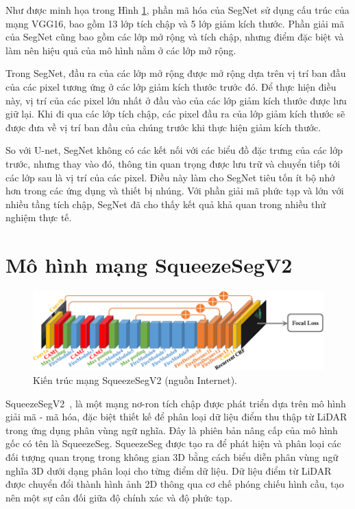 Như được minh họa trong Hình \ref{fig_SegNet}, phần mã hóa của SegNet sử dụng cấu trúc của mạng VGG16, bao gồm 13 lớp tích chập và 5 lớp giảm kích thước. Phần giải mã của SegNet cũng bao gồm các lớp mở rộng và tích chập, nhưng điểm đặc biệt và làm nên hiệu quả của mô hình nằm ở các lớp mở rộng.

Trong SegNet, đầu ra của các lớp mở rộng được mở rộng dựa trên vị trí ban đầu của các pixel tương ứng ở các lớp giảm kích thước trước đó. Để thực hiện điều này, vị trí của các pixel lớn nhất ở đầu vào của các lớp giảm kích thước được lưu giữ lại. Khi đi qua các lớp tích chập, các pixel đầu ra của lớp giảm kích thước sẽ được đưa về vị trí ban đầu của chúng trước khi thực hiện giảm kích thước.

So với U-net, SegNet không có các kết nối với các biểu đồ đặc trưng của các lớp trước, nhưng thay vào đó, thông tin quan trọng được lưu trữ và chuyển tiếp tới các lớp sau là vị trí của các pixel. Điều này làm cho SegNet tiêu tốn ít bộ nhớ hơn trong các ứng dụng và thiết bị nhúng. Với phần giải mã phức tạp và lớn với nhiều tầng tích chập, SegNet đã cho thấy kết quả khả quan trong nhiều thử nghiệm thực tế.

\section{Mô hình mạng SqueezeSegV2}

\begin{figure}[h]
	\centering
	\includegraphics[width=120mm]{fig/SegNetV2-architecture.png}
        \captionsetup{justification=centering}
	\caption{Kiến trúc mạng SqueezeSegV2 (nguồn Internet).}
	\label{fig_SegNet}
\end{figure}

SqueezeSegV2~\cite{wu2019squeezesegv2}, là một mạng nơ-ron tích chập được phát triển dựa trên mô hình giải mã - mã hóa, đặc biệt thiết kế để phân loại dữ liệu điểm thu thập từ LiDAR trong ứng dụng phân vùng ngữ nghĩa. Đây là phiên bản nâng cấp của mô hình gốc có tên là SqueezeSeg. SqueezeSeg được tạo ra để phát hiện và phân loại các đối tượng quan trọng trong không gian 3D bằng cách biểu diễn phân vùng ngữ nghĩa 3D dưới dạng phân loại cho từng điểm dữ liệu. Dữ liệu điểm từ LiDAR được chuyển đổi thành hình ảnh 2D thông qua cơ chế phóng chiếu hình cầu, tạo nên một sự cân đối giữa độ chính xác và độ phức tạp.

